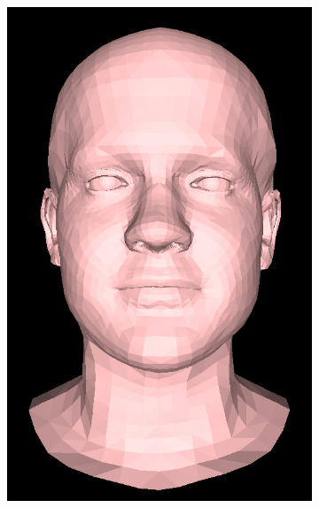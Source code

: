\begin{figure}[h!]
    \centering
    \begin{subfigure}[b]{0.19\textwidth}
        \includegraphics[width=\textwidth]{figures/gen_sample/00001.png}
    \end{subfigure}
    \begin{subfigure}[b]{0.19\textwidth}

\end{subfigure}
\end{figure}
